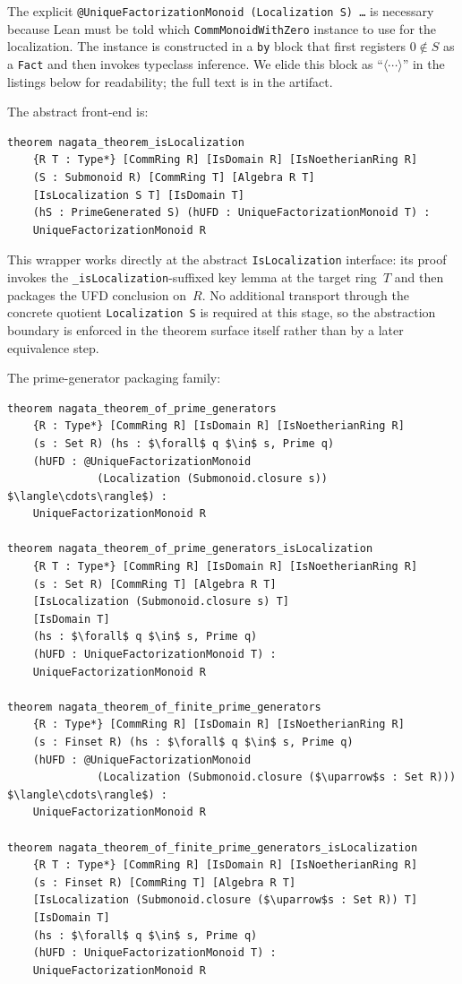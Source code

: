 \documentclass[11pt]{article}
\theoremstyle{plain}
\theoremstyle{definition}
\theoremstyle{remark}
\newcommand{\li}[1]{\texorpdfstring{\texttt{#1}}{#1}}
\begin{document}
\noindent
The explicit \li{@UniqueFactorizationMonoid (Localization S) \ldots} is
necessary because Lean must be told which \li{CommMonoidWithZero} instance to
use for the localization.  The instance is constructed in a \li{by} block that
first registers $0\notin S$ as a \li{Fact} and then invokes typeclass
inference.  We elide this block as ``$\langle\cdots\rangle$'' in the listings
below for readability; the full text is in the artifact.

The abstract front-end is:

\begin{lstlisting}[style=lean]
theorem nagata_theorem_isLocalization
    {R T : Type*} [CommRing R] [IsDomain R] [IsNoetherianRing R]
    (S : Submonoid R) [CommRing T] [Algebra R T]
    [IsLocalization S T] [IsDomain T]
    (hS : PrimeGenerated S) (hUFD : UniqueFactorizationMonoid T) :
    UniqueFactorizationMonoid R
\end{lstlisting}

\noindent
This wrapper works directly at the abstract \li{IsLocalization} interface: its
proof invokes the \li{\_isLocalization}-suffixed key lemma at the target
ring~$T$ and then packages the UFD conclusion on~$R$.  No additional transport
through the concrete quotient \li{Localization\,S} is required at this stage,
so the abstraction boundary is enforced in the theorem surface itself rather
than by a later equivalence step.

The prime-generator packaging family:

\begin{lstlisting}[style=lean]
theorem nagata_theorem_of_prime_generators
    {R : Type*} [CommRing R] [IsDomain R] [IsNoetherianRing R]
    (s : Set R) (hs : $\forall$ q $\in$ s, Prime q)
    (hUFD : @UniqueFactorizationMonoid
              (Localization (Submonoid.closure s)) $\langle\cdots\rangle$) :
    UniqueFactorizationMonoid R

theorem nagata_theorem_of_prime_generators_isLocalization
    {R T : Type*} [CommRing R] [IsDomain R] [IsNoetherianRing R]
    (s : Set R) [CommRing T] [Algebra R T]
    [IsLocalization (Submonoid.closure s) T]
    [IsDomain T]
    (hs : $\forall$ q $\in$ s, Prime q)
    (hUFD : UniqueFactorizationMonoid T) :
    UniqueFactorizationMonoid R

theorem nagata_theorem_of_finite_prime_generators
    {R : Type*} [CommRing R] [IsDomain R] [IsNoetherianRing R]
    (s : Finset R) (hs : $\forall$ q $\in$ s, Prime q)
    (hUFD : @UniqueFactorizationMonoid
              (Localization (Submonoid.closure ($\uparrow$s : Set R))) $\langle\cdots\rangle$) :
    UniqueFactorizationMonoid R

theorem nagata_theorem_of_finite_prime_generators_isLocalization
    {R T : Type*} [CommRing R] [IsDomain R] [IsNoetherianRing R]
    (s : Finset R) [CommRing T] [Algebra R T]
    [IsLocalization (Submonoid.closure ($\uparrow$s : Set R)) T]
    [IsDomain T]
    (hs : $\forall$ q $\in$ s, Prime q)
    (hUFD : UniqueFactorizationMonoid T) :
    UniqueFactorizationMonoid R
\end{lstlisting}
\end{document}
